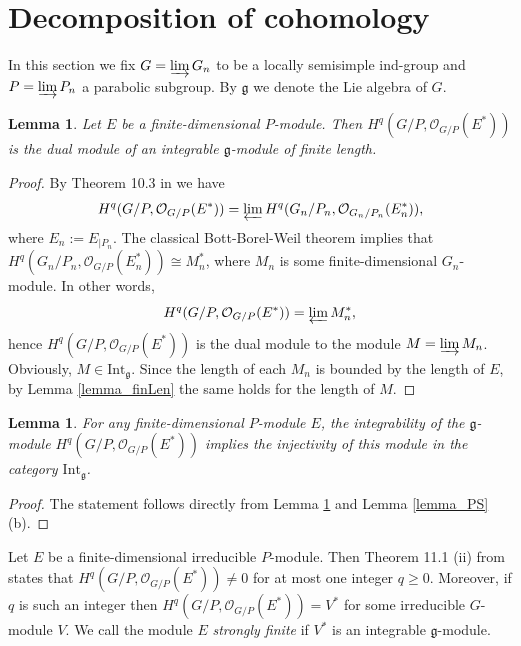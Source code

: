 \documentclass[12pt]{article}
\newcommand{\Int} {\mathrm{Int}}
\def \OO {{\mathcal O}}
\def \g {\mathfrak{g}}
\newtheorem{lemma}[theorem]{Lemma}
\begin{document}
\section{Decomposition of cohomology}

In this section we fix $G = \varinjlim G_n$ to be a locally semisimple ind-group and $P  = \varinjlim P_n$ a parabolic subgroup. By $\g$ we denote the Lie algebra of $G$.

\begin{lemma} \label{lemma_DualModule} %
Let $E$ be a finite-dimensional %
$P$-module.
Then $H^{q}(G/P, \OO_{G/P}(E^*))$ is the dual module of an integrable $\g$-module of finite length.
\end{lemma}

\begin{proof}
By Theorem 10.3 in \cite{DPW} we have
$$
H^{q}(G/P, \OO_{G/P}(E^*))  = \varprojlim H^{q}(G_n/P_n, \OO_{G_n/P_n}(E_n^*)),
$$
where $E_n:= E_{\vert P_n}$. The classical Bott-Borel-Weil theorem implies that $H^{q}(G_n/P_n, \OO_{G/P}(E_n^*)) \cong M_n^*$, where $M_n$ is some finite-dimensional %
$G_n$-module. In other words, 
$$
H^{q}(G/P, \OO_{G/P}(E^*)) = \varprojlim M_n^*,
$$
hence $H^{q}(G/P, \OO_{G/P}(E^*))$ is the dual module to the module $M = \varinjlim M_n$. Obviously, $M \in \Int_{\g}$. Since the length of each $M_n$ is bounded by the length of $E$, by Lemma \ref{lemma_finLen} the same holds for the length of $M$.
\end{proof}


\begin{lemma} \label{lemma_Inj} For any finite-dimensional $P$-module $E$, the integrability of the $\g$-module $H^q(G/P, \OO_{G/P}(E^*))$ implies the injectivity of this module in the category $\Int_{\g}$.
\end{lemma}
\begin{proof}
The statement follows directly from Lemma \ref{lemma_DualModule} and Lemma \ref{lemma_PS} (b).
\end{proof}

Let $E$ be a finite-dimensional irreducible $P$-module. 
Then Theorem 11.1 (ii) from \cite{DPW} states that $H^q(G/P, \OO_{G/P}(E^*)) \neq 0$ for at most one integer $q \geq 0$. Moreover, if $q$ is such an integer then $H^q(G/P, \OO_{G/P}(E^*)) = V^*$ for some irreducible %
$G$-module $V$. We call the module $E$ \textit{strongly finite} if $V^*$ is an integrable $\g$-module.
\end{document}
